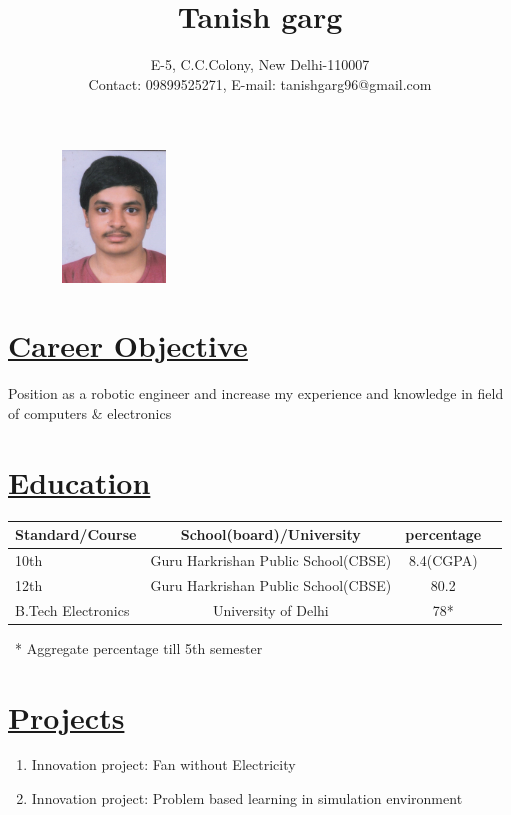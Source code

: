 \documentclass[14pt,a4paper,twoside]{article}
\begin{document}
	
	\title{Tanish garg}
		\author{E-5, C.C.Colony, New Delhi-110007 \\ Contact: 09899525271,  E-mail: tanishgarg96@gmail.com}
	\maketitle
	
	\begin{figure}[!h]
		\centering
		\includegraphics[width=3.5cm,height=3.5cm]{passportpic001}
	\end{figure}		
		
	\section*{\underline{\textbf{Career Objective}}}

	Position as a robotic engineer and increase my experience and knowledge in field of computers \& electronics
	
	\section*{\underline{\textbf{Education}}}
		\begin{tabular}{|l||c||c||r|}
			\hline
			Standard/Course & School(board)/University & percentage \\
			\hline
			10th & Guru Harkrishan Public School(CBSE) & 8.4(CGPA)\\
			\hline
			12th & Guru Harkrishan Public School(CBSE) & 80.2\\
			\hline
			B.Tech Electronics & University of Delhi & 78*\\
			
		\end{tabular}
		
		
	  \ * Aggregate percentage till 5th semester	
	\section*{\underline{\textbf{Projects}}}
		\begin{enumerate}
			\item Innovation project: Fan without Electricity
			\item Innovation project: Problem based learning in simulation environment 
		\end{enumerate}
	
\end{document}
